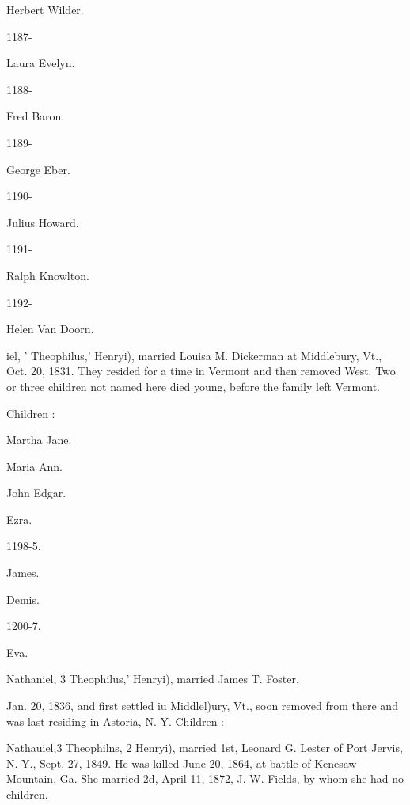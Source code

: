 \documentclass{book}
\begin{document}
Herbert Wilder. 


1187- 




Laura Evelyn. 


1188- 




Fred Baron. 


1189- 




George Eber. 


1190- 




Julius Howard. 


1191- 




Ralph Knowlton. 


1192- 




Helen Van Doorn. 



iel, ' Theophilus,' Henryi), married Louisa M. Dickerman at 
Middlebury, Vt., Oct. 20, 1831. They resided for a time in 
Vermont and then removed West. Two or three children not 
named here died young, before the family left Vermont. 

Children : 





Martha Jane. 




Maria Ann. 




John Edgar. 




Ezra. 


1198-5. 


James. 




Demis. 


1200-7. 


Eva. 



Nathaniel, 3 Theophilus,' Henryi), married James T. Foster, 




Jan. 20, 1836, and first settled iu Middlel)ury, Vt., soon removed 
from there and was last residing in Astoria, N. Y. Children : 









Nathauiel,3 Theophilns, 2 Henryi), married 1st, Leonard G. Lester 
of Port Jervis, N. Y., Sept. 27, 1849. He was killed June 20, 
1864, at battle of Kenesaw Mountain, Ga. She married 2d, 
April 11, 1872, J. W. Fields, by whom she had no children. 
\end{document}
